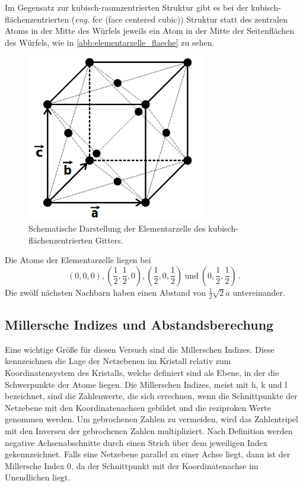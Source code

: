 Im Gegensatz zur kubisch-raumzentrierten Struktur gibt es bei der kubisch-flächenzentrierten
(\textit{eng.} fcc (face centered cubic)) Struktur statt des zentralen Atoms in der
Mitte des Würfels jeweils ein Atom in der Mitte der Seitenflächen des Würfels, wie
in \autoref{abb:elementarzelle_flaeche} zu sehen.
\begin{figure}
  \centering
  \includegraphics[scale=0.5]{content/pics/elementarzelle_flaeche.png}
  \caption{Schematische Darstellung der Elementarzelle des kubisch-flächenzentrierten
  Gitters. \cite{anleitung}}
  \label{abb:elementarzelle_flaeche}
\end{figure}
Die Atome der Elementarzelle liegen bei
\begin{equation}
  (0, 0, 0), (\frac{1}{2}, \frac{1}{2}, 0), (\frac{1}{2}, 0, \frac{1}{2}) \ \text{und}
  \ (0, \frac{1}{2}, \frac{1}{2}) \, .
  \label{eqn:atome-flaechenzentriert}
\end{equation}
Die zwölf nächsten Nachbarn haben einen Abstand von $\frac{1}{2} \sqrt{2} a$
untereinander.
\pagebreak
\subsection{Millersche Indizes und Abstandsberechung}

Eine wichtige Größe für diesen Versuch sind die Millerschen Indizes. Diese kennzeichnen
die Lage der Netzebenen im Kristall relativ zum Koordinatensystem des Kristalls,
welche definiert sind als Ebene, in der die Schwerpunkte der Atome liegen.
Die Millerschen Indizes, meist mit h, k und l bezeichnet, sind die Zahlenwerte,
die sich errechnen, wenn die Schnittpunkte der Netzebene mit den Koordinatenachsen
gebildet und die reziproken Werte genommen werden. Um gebrochenen Zahlen zu vermeiden,
wird das Zahlentripel mit den Inversen der gebrochenen Zahlen multipliziert. Nach
Definition werden negative Achsenabschnitte durch einen Strich über dem jeweiligen Index
gekennzeichnet. Falls eine Netzebene parallel zu einer Achse liegt, dann ist der Millersche
Index 0, da der Schnittpunkt mit der Koordinatenachse im Unendlichen liegt.


